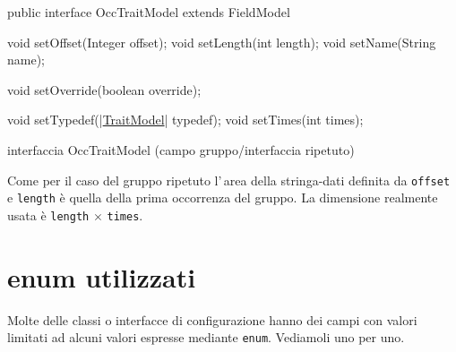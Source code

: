 \documentclass[a4paper,10pt]{report}
\newif\ifesource
\newenvironment{elisting}[1][H]
  {\captionsetup{aboveskip=0pt}\begin{listing}[#1]}
  {\end{listing}%
}
\begin{document}
\ifesource
\begin{figure*}[!htb]
\begin{lstlisting}[language=java, 
caption=interfaccia OccTraitModel (campo gruppo/interfaccia ripetuto), 
label=lst:OccTraitModel]
public interface OccTraitModel extends FieldModel {
    void setOffset(Integer offset);
    void setLength(int length);
    void setName(String name);
    
    void setOverride(boolean override);
    
    void setTypedef((*\hyperref[lst:TraitModel]{TraitModel}*) typedef);
    void setTimes(int times);
}
\end{lstlisting}\index{OccTraitModel}
\end{figure*}
\else
\begin{elisting}[!htb]
\begin{javacode}
public interface OccTraitModel extends FieldModel {
    void setOffset(Integer offset);
    void setLength(int length);
    void setName(String name);
    
    void setOverride(boolean override);
    
    void setTypedef(|\hyperref[lst:TraitModel]{TraitModel}| typedef);
    void setTimes(int times);
}
\end{javacode}
\caption{interfaccia OccTraitModel (campo gruppo/interfaccia ripetuto)}
\label{lst:OccTraitModel}
\end{elisting}
\fi
Come per il caso del gruppo ripetuto l'\,area della stringa-dati definita 
da \verb!offset! e \verb!length! è quella della prima occorrenza del gruppo. 
La dimensione realmente usata è \verb!length! $\times$ \verb!times!.

\vspace*{5cm}

\chapter{enum utilizzati}
Molte delle classi o interfacce di configurazione hanno dei campi con valori
limitati ad alcuni valori espresse mediante \texttt{enum}.
Vediamoli uno per uno.
\end{document}
